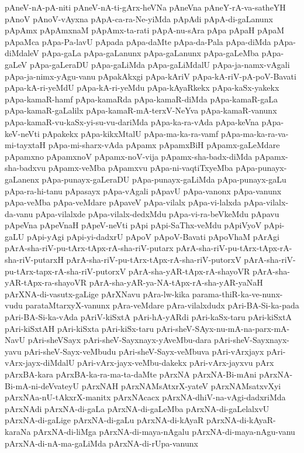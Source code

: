 {pAneV-nA-pA-niti
pAneV-nA-ti-gArx-heVNa
pAneVna
pAneY-rA-va-satheYH
pAnoV
pAnoV-vAyxna
pApA-ca-ra-Ne-yiMda
pApAdi
pApA-di-gaLanunx
pApAmx
pApAmxnaM
pApAmx-ta-rati
pApA-nu-sAra
pApa
pApaH
pApaM
pApaMca
pApa-Pa-lavU
pApada
pApa-daMte
pApa-da-Pala
pApa-diMda
pApa-diMdaleV
pApa-gaLa
pApa-gaLanunx
pApa-gaLanunx
pApa-gaLeMba
pApa-gaLeV
pApa-gaLeraDU
pApa-gaLiMda
pApa-gaLiMdalU
pApa-ja-namx-vAgali
pApa-ja-nimx-yAgu-vanu
pApakAkxgi
pApa-kAriV
pApa-kA-riV-pA-poV-Bavati
pApa-kA-ri-yeMdU
pApa-kA-ri-yeMdu
pApa-kAyaRkekx
pApa-kaSx-yakekx
pApa-kamaR-hamf
pApa-kamaRda
pApa-kamaR-diMda
pApa-kamaR-gaLa
pApa-kamaR-gaLalilx
pApa-kamaR-mA-terxV-NeYva
pApa-kamaR-vanunx
pApa-kamaR-vu-kaSx-yi-su-vu-dariMda
pApa-ka-ra-vAda
pApa-keVna
pApa-keV-neVti
pApakekx
pApa-kikxMtalU
pApa-ma-ka-ra-vamf
pApa-ma-ka-ra-va-mi-tayxtaH
pApa-mi-sharx-vAda
pApamx
pApamxBiH
pApamx-gaLeMdare
pApamxno
pApamxnoV
pApamx-noV-vija
pApamx-sha-badx-diMda
pApamx-sha-badxvu
pApamx-veMba
pApamxvu
pApa-ni-vaqtiTxyeMba
pApa-punayx-gaLanenx
pApa-punayx-gaLeraDU
pApa-punayx-gaLiMda
pApa-punayx-gaLu
pApa-ra-hi-tanu
pApasayx
pApa-vAgali
pApavU
pApa-vanonx
pApa-vanunx
pApa-veMba
pApa-veMdare
pApaveV
pApa-vilalx
pApa-vi-lalxda
pApa-vilalx-da-vanu
pApa-vilalxde
pApa-vilalx-dedxMdu
pApa-vi-ra-beVkeMdu
pApavu
pApeVna
pApeVnaH
pApeV-neVti
pApi
pApi-SaThx-veMdu
pApiVyoV
pApi-gaLU
pApi-yAgi
pApi-yi-dadxrU
pApoV
pApoV-Bavati
pApoVhaM
pArAgi
pArA-sha-riV-pu-tArx-tApx-rA-sha-riV-putarx
pArA-sha-riV-pu-tArx-tApx-rA-sha-riV-putarxH
pArA-sha-riV-pu-tArx-tApx-rA-sha-riV-putorxV
pArA-sha-riV-pu-tArx-tapx-rA-sha-riV-putorxV
pArA-sha-yAR-tApx-rA-shayoVR
pArA-sha-yAR-tApx-ra-shayoVR
pArA-sha-yAR-ya-NA-tApx-rA-sha-yAR-yaNaH
pArXNA-di-vasutx-gaLige
pArXNavu
pAra-lw-kika
parama-thiR-ka-ve-nunx-vudu
parataMtarxyX-vanunx
pAra-veMdare
pAra-vilalxdudx
pAri-BA-Si-ka-pada
pAri-BA-Si-ka-vAda
pAriV-kiSxtA
pAri-hA-yARdi
pAri-kaSx-taru
pAri-kiSxtA
pAri-kiSxtAH
pAri-kiSxta
pAri-kiSx-taru
pAri-sheV-SAyx-nu-mA-na-parx-mA-NavU
pAri-sheVSayx
pAri-sheV-Sayxnayx-yAveMbu-dara
pAri-sheV-Sayxnayx-yavu
pAri-sheV-Sayx-veMbudu
pAri-sheV-Sayx-veMbuva
pAri-vArxjayx
pAri-vArx-jayx-diMdalU
pAri-vArx-jayx-veMbu-dakekx
pAri-vArx-jayxvu
pArx
pArxBA-kara
pArxBA-ka-ra-ma-ta-daMte
pArxNA
pArxNA-Bi-mAni
pArxNA-Bi-mA-ni-deVvateyU
pArxNAH
pArxNAMsAtxrX-yateV
pArxNAMsatxvXyi
pArxNAa-nU-tAkxrX-manitx
pArxNAcacx
pArxNA-dhiV-na-vAgi-dadxriMda
pArxNAdi
pArxNA-di-gaLa
pArxNA-di-gaLeMba
pArxNA-di-gaLelalxvU
pArxNA-di-gaLige
pArxNA-di-gaLu
pArxNA-di-kAyaR
pArxNA-di-kAyaR-karaNa
pArxNA-di-liMga
pArxNA-di-maya-nAgalu
pArxNA-di-maya-nAgu-vanu
pArxNA-di-nA-ma-gaLiMda
pArxNA-di-rUpa-vanunx
}
